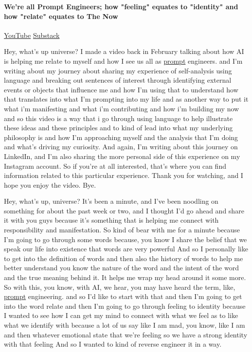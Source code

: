 \begin{nobullet}
    \item \textbf{We're all Prompt Engineers; how "feeling" equates to "identity" and how "relate" equates to The Now} \\\\
    \href{https://youtu.be/t0rg1TTIP9U}{\faYoutube[regular] \enskip YouTube} \qquad
    \href{https://therealzackolinger.substack.com/p/were-all-prompt-engineers?r=4jsge9}{\faNewspaper[regular] \enskip Substack}
\end{nobullet}

Hey, what's up universe? I made a video back in February talking about how AI is helping me relate to myself and how I see us all as \hyperlink{gloss:prompt}{prompt} engineers. and I'm writing about my journey about sharing my experience of self-analysis using language and breaking out sentences of interest through identifying external events or objects that influence me and how I'm using that to understand how that translates into what I'm prompting into my life and as another way to put it what i'm manifesting and what i'm contributing and how i'm building my now and so this video is a way that i go through using language to help illustrate these ideas and these principles and to kind of lead into what my underlying philosophy is and how I'm approaching myself and the analysis that I'm doing and what's driving my curiosity. And again, I'm writing about this journey on LinkedIn, and I'm also sharing the more personal side of this experience on my Instagram account. So if you're at all interested, that's where you can find information related to this particular experience. Thank you for watching, and I hope you enjoy the video. Bye. 

Hey, what's up, universe? It's been a minute, and I've been noodling on something for about the past week or two, and I thought I'd go ahead and share it with you guys because it's something that is helping me connect with responsibility and manifestation. So kind of bear with me for a minute because I'm going to go through some words because, you know I share the belief that we speak our life into existence that words are very powerful And so I personally like to get into the definition of words and then also the history of words to help me better understand you know the nature of the word and the intent of the word and the true meaning behind it. It helps me wrap my head around it some more. So with this, you know, with AI, we hear, you may have heard the term, like, \hyperlink{gloss:prompt}{prompt} engineering. and so I'd like to start with that and then I'm going to get into the word relate and then I'm going to go through feeling to identity because I wanted to see how I can get my mind to connect with what we feel as to like what we identify with because a lot of us say like I am mad, you know, like I am and then whatever emotional state that we're feeling so we have a strong identity with that feeling And so I wanted to kind of reverse engineer it in a way. 

